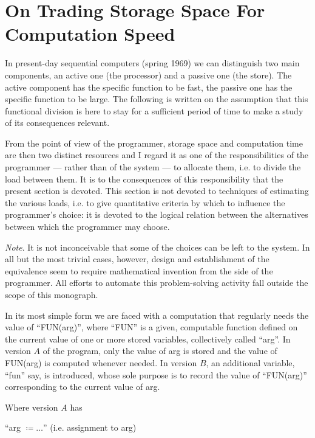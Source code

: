 \section[On trading storage space for computation speed]{On Trading Storage Space For Computation Speed}
\label{sec:trading-storage-for-computation-speed}

In present-day sequential computers (spring 1969) we can distinguish two main components, an active one (the processor) and a passive one (the store). The active component has the specific function to be fast, the passive one has the specific function to be large. The following is written on the assumption that this functional division is here to stay for a sufficient period of time to make a study of its consequences relevant.

From the point of view of the programmer, storage space and computation time are then two distinct resources and I regard it as one of the responsibilities of the programmer --- rather than of the system --- to allocate them, i.e. to divide the load between them. It is to the consequences of this responsibility that the present section is devoted. This section is not devoted to techniques of estimating the various loads, i.e. to give quantitative criteria by which to influence the programmer's choice: it is devoted to the logical relation between the alternatives between which the programmer may choose.

\noindent
\textit{Note}. It is not inconceivable that some of the choices can be left to the system. In all but the most trivial cases, however, design and establishment of the equivalence seem to require mathematical invention from the side of the programmer. All efforts to automate this problem-solving activity fall outside the scope of this monograph.

In its most simple form we are faced with a computation that regularly needs the value of ``FUN(arg)'', where ``FUN'' is a given, computable function defined on the current value of one or more stored variables, collectively called ``arg''. In version $A$ of the program, only the value of arg is stored and the value of FUN(arg) is computed whenever needed. In version $B$, an additional variable, ``fun'' say, is introduced, whose sole purpose is to record the value of ``FUN(arg)'' corresponding to the current value of arg.

Where version $A$ has
\medskip

{
	\setlength{\parindent}{8em}
	\hspace{-.4em}``arg $\coloneq \dots$'' (i.e. assignment to arg)
	
}
\medskip

